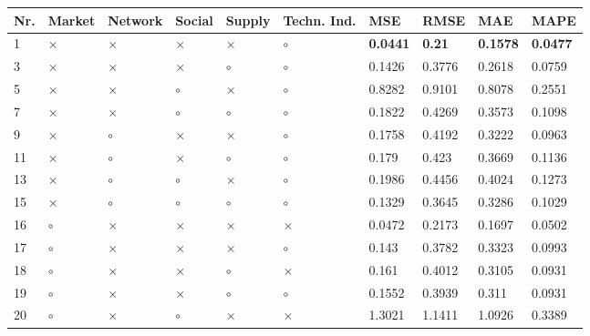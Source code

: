 \begin{table}[H]
\centering
\begin{tabular}{|P{0.7cm}|P{1.3cm}P{1.3cm}P{1.3cm}P{1.3cm}P{1.3cm}|P{1.1cm}P{1.1cm}P{1.1cm}P{1.1cm}|}
\hline
 Nr. &   Market &  Network &   Social &   Supply & Techn. Ind. &             MSE &          RMSE &             MAE &            MAPE \\
 & $\times$ & $\times$ & $\times$ & $\times$ &     $\circ$ & \textbf{0.0441} & \textbf{0.21} & \textbf{0.1578} & \textbf{0.0477} \\
   3 & $\times$ & $\times$ & $\times$ &  $\circ$ &     $\circ$ &          0.1426 &        0.3776 &          0.2618 &          0.0759 \\
   5 & $\times$ & $\times$ &  $\circ$ & $\times$ &     $\circ$ &          0.8282 &        0.9101 &          0.8078 &          0.2551 \\
   7 & $\times$ & $\times$ &  $\circ$ &  $\circ$ &     $\circ$ &          0.1822 &        0.4269 &          0.3573 &          0.1098 \\
   9 & $\times$ &  $\circ$ & $\times$ & $\times$ &     $\circ$ &          0.1758 &        0.4192 &          0.3222 &          0.0963 \\
  11 & $\times$ &  $\circ$ & $\times$ &  $\circ$ &     $\circ$ &           0.179 &         0.423 &          0.3669 &          0.1136 \\
  13 & $\times$ &  $\circ$ &  $\circ$ & $\times$ &     $\circ$ &          0.1986 &        0.4456 &          0.4024 &          0.1273 \\
  15 & $\times$ &  $\circ$ &  $\circ$ &  $\circ$ &     $\circ$ &          0.1329 &        0.3645 &          0.3286 &          0.1029 \\
  16 &  $\circ$ & $\times$ & $\times$ & $\times$ &    $\times$ &          0.0472 &        0.2173 &          0.1697 &          0.0502 \\
  17 &  $\circ$ & $\times$ & $\times$ & $\times$ &     $\circ$ &           0.143 &        0.3782 &          0.3323 &          0.0993 \\
  18 &  $\circ$ & $\times$ & $\times$ &  $\circ$ &    $\times$ &           0.161 &        0.4012 &          0.3105 &          0.0931 \\
  19 &  $\circ$ & $\times$ & $\times$ &  $\circ$ &     $\circ$ &          0.1552 &        0.3939 &           0.311 &          0.0931 \\
  20 &  $\circ$ & $\times$ &  $\circ$ & $\times$ &    $\times$ &          1.3021 &        1.1411 &          1.0926 &          0.3389 \\

\end{tabular}
\end{table}
